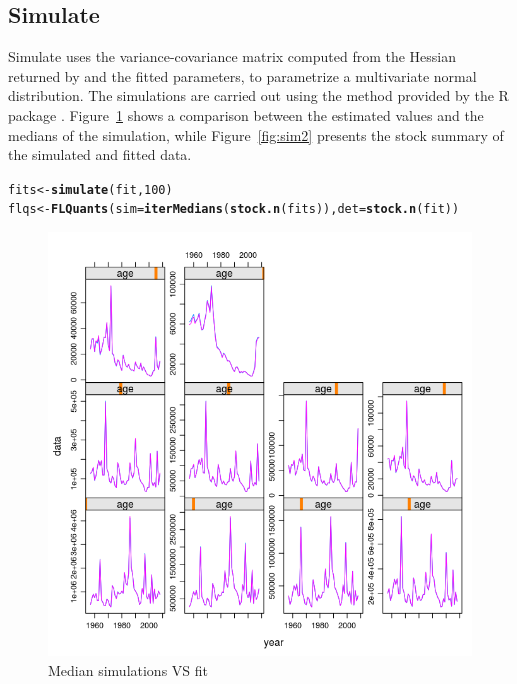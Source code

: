 \documentclass[a4paper,english,10pt]{article}\usepackage[]{graphicx}\usepackage[]{color}
\makeatletter
\def\maxwidth{ %
  \ifdim\Gin@nat@width>\linewidth
    \linewidth
  \else
    \Gin@nat@width
  \fi
}
\newcommand{\hlnum}[1]{\textcolor[rgb]{0.686,0.059,0.569}{#1}}%
\newcommand{\hlstd}[1]{\textcolor[rgb]{0.345,0.345,0.345}{#1}}%
\newcommand{\hlkwb}[1]{\textcolor[rgb]{0.69,0.353,0.396}{#1}}%
\newcommand{\hlkwc}[1]{\textcolor[rgb]{0.333,0.667,0.333}{#1}}%
\newcommand{\hlkwd}[1]{\textcolor[rgb]{0.737,0.353,0.396}{\textbf{#1}}}%
\newenvironment{kframe}{%
 \def\at@end@of@kframe{}%
 \ifinner\ifhmode%
  \def\at@end@of@kframe{\end{minipage}}%
  \begin{minipage}{\columnwidth}%
 \fi\fi%
 \def\FrameCommand##1{\hskip\@totalleftmargin \hskip-\fboxsep
 \colorbox{shadecolor}{##1}\hskip-\fboxsep
     \hskip-\linewidth \hskip-\@totalleftmargin \hskip\columnwidth}%
 \MakeFramed {\advance\hsize-\width
   \@totalleftmargin\z@ \linewidth\hsize
   \@setminipage}}%
 {\par\unskip\endMakeFramed%
 \at@end@of@kframe}
\newenvironment{knitrout}{}{} %
\makeatother
\begin{document}
\subsection{Simulate}

Simulate uses the variance-covariance matrix computed from the Hessian returned by  and the fitted parameters, to parametrize a multivariate normal distribution. The simulations are carried out using the method  provided by the R package \href{http://cran.r-project.org/web/packages/MASS/}{}. Figure~\ref{fig:sim} shows a comparison between the estimated values and the medians of the simulation, while Figure~\ref{fig:sim2} presents the stock summary of the simulated and fitted data.

\begin{knitrout}
\color{fgcolor}\begin{kframe}
\begin{alltt}
\hlstd{fits} \hlkwb{<-} \hlkwd{simulate}\hlstd{(fit,} \hlnum{100}\hlstd{)}
\hlstd{flqs} \hlkwb{<-} \hlkwd{FLQuants}\hlstd{(}\hlkwc{sim} \hlstd{=} \hlkwd{iterMedians}\hlstd{(}\hlkwd{stock.n}\hlstd{(fits)),} \hlkwc{det} \hlstd{=} \hlkwd{stock.n}\hlstd{(fit))}
\end{alltt}
\end{kframe}
\end{knitrout}

\begin{knitrout}
\color{fgcolor}\begin{figure}[H]

{\centering \includegraphics[width=\maxwidth]{figure/sim-1} 

}

\caption[Median simulations VS fit]{Median simulations VS fit}\label{fig:sim}
\end{figure}


\end{knitrout}
\end{document}

